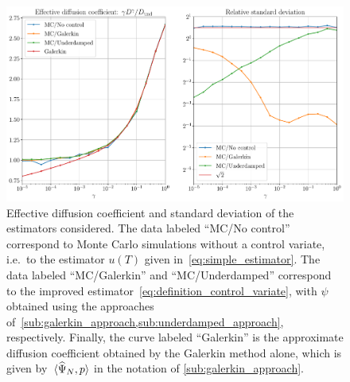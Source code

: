 \documentclass[11pt,a4paper]{article}
\begin{document}
\begin{figure}[ht]
    \centering
    \includegraphics[width=0.99\linewidth]{figures/underdamped_1d.pdf}
    \caption{
        Effective diffusion coefficient and standard deviation of the estimators considered.
        The data labeled ``MC/No control'' correspond to Monte Carlo simulations without a control variate,
        i.e.\ to the estimator $u(T)$ given in~\eqref{eq:simple_estimator}.
        The data labeled ``MC/Galerkin'' and ``MC/Underdamped'' correspond to the improved estimator~\eqref{eq:definition_control_variate},
        with $\psi$ obtained using the approaches of~\cref{sub:galerkin_approach,sub:underdamped_approach},
        respectively.
        Finally, the curve labeled ``Galerkin'' is the approximate diffusion coefficient obtained by the Galerkin method alone,
        which is given by~$\ip*{\widehat \Psi_N}{p}$ in the notation of \cref{sub:galerkin_approach}.
    }%
    \label{fig:effective_diffusion_langevin}
\end{figure}
\end{document}
